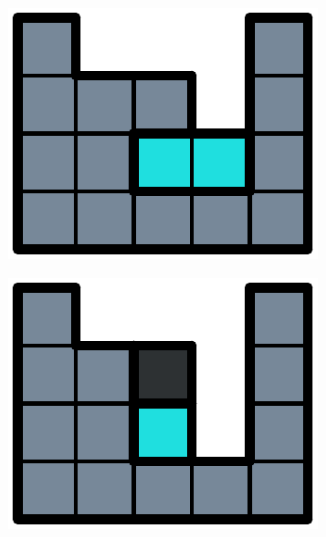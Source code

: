 \begin{figure}[ht]
  \centering
  \begin{subfigure}[b]{0.15\textwidth}
    \centering
    \includegraphics[width=0.9\textwidth]{pictures/dominoes/drs-1.pdf}
    \caption{}
  \end{subfigure}
  \begin{subfigure}[b]{0.15\textwidth}
    \centering
    \includegraphics[width=0.9\textwidth]{pictures/dominoes/drs-2.pdf}
    \caption{}
  \end{subfigure}
  \begin{subfigure}[b]{0.15\textwidth}
    \centering

\end{subfigure}
\end{figure}
